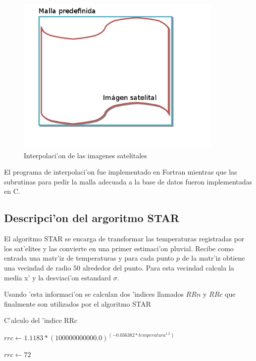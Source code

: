   \begin{figure}[h!]
  \centering
  \includegraphics[width=100mm,bb=0 0 502 388]{./imagenes/malla.jpg}
  \caption{Interpolaci'on de las imagenes satelitales}
  \end{figure}

  El programa de interpolaci'on fue implementado en Fortran mientras que las subrutinas para 
  pedir la malla adecuada a la base de datos fueron implementadas en C.

\subsection{Descripci'on del argoritmo STAR}
  El algoritmo STAR se encarga de transformar las temperaturas registradas por los sat'elites y las convierte
  en una primer estimaci'on pluvial. Recibe como entrada una matr'iz de temperaturas y para cada punto $p$ de la matr'iz
  obtiene una vecindad de radio $50$ alrededor del punto. Para esta vecindad calcula la media x' y la desviaci'on estandard $\sigma$.

  Usando 'esta informaci'on se calculan dos 'indices llamados $RRn$ y $RRc$ que finalmente son utilizados por el algoritmo STAR

  \begin{algorithm}
  \caption{C'alculo del 'indice RRc}

  \begin{algorithmic}
	  \STATE $rrc \gets 1.1183* (100000000000.0)^(-0.036382*temperatura^{1.2})$
  \ELSE
	  
	  \STATE $rrc \gets 72$ 
	  
  \ENDIF 
  \end{algorithmic}
  \end{algorithm}

